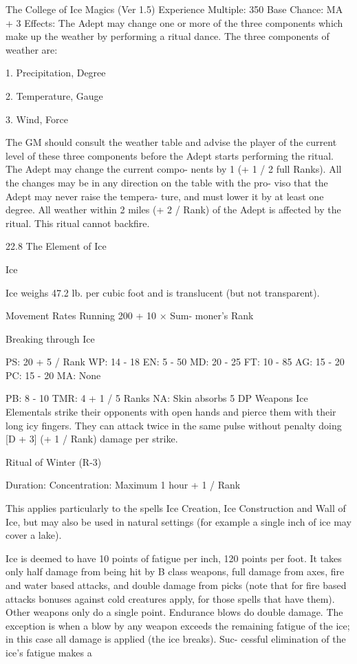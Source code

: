 \begin{Chapter}{The College of Ice Magics (Ver 1.5)}
Experience Multiple: 350 
Base Chance: MA + 3%
Effects: The Adept may change one or more of the 
three  components  which  make  up  the  weather  by 
performing a ritual dance. The three components of 
weather are: 

1. Precipitation, Degree 

2. Temperature, Gauge 

3. Wind, Force 

The  GM  should  consult  the  weather  table  and 
advise the player of the current level of these three 
components before the Adept starts performing the 
ritual.  The  Adept  may  change  the  current  compo-
nents  by  1  (+  1  /  2  full  Ranks).  All  the  changes 
may  be  in any  direction  on  the  table  with  the  pro-
viso  that  the  Adept  may  never  raise  the  tempera-
ture,  and must  lower  it  by  at  least  one  degree.  All 
weather within 2 miles (+ 2 / Rank) of the Adept is 
affected by the ritual. This ritual cannot backfire. 

22.8 The Element of Ice 

Ice 

Ice weighs 47.2 lb. per cubic foot and is translucent 
(but not transparent). 

Movement  Rates  Running  200  +  10  ×  Sum-
moner’s Rank 

Breaking through Ice 

PS: 20 + 5 / Rank  WP: 14 - 18 
EN: 5 - 50 
MD: 20 - 25 
FT: 10 - 85 
AG: 15 - 20 
PC: 15 - 20 
MA: None 
 
PB: 8 - 10 
TMR: 4 + 1 / 5 Ranks 
NA: Skin absorbs 5 DP 
Weapons  Ice  Elementals  strike  their  opponents 
with  open  hands  and  pierce  them  with  their  long 
icy fingers. They can attack twice in the same pulse 
without penalty doing [D + 3] (+ 1 / Rank) damage 
per strike. 

Ritual of Winter (R-3) 

Duration:  Concentration:  Maximum  1  hour  +  1  / 
Rank 

This applies particularly to the spells  Ice Creation, 
Ice Construction and Wall of  Ice, but may also be 
used  in  natural  settings  (for  example  a  single  inch 
of ice may cover a lake). 

Ice is deemed to have 10 points of fatigue per inch, 
120 points per foot. It takes only half damage from 
being  hit  by  B  class  weapons,  full  damage  from 
axes,  fire  and  water  based  attacks,  and  double 
damage from picks (note that for fire based attacks 
bonuses  against  cold  creatures  apply,  for  those 
spells  that  have  them).  Other  weapons  only  do  a 
single  point.  Endurance  blows  do  double  damage. 
The  exception  is  when  a  blow  by  any  weapon 
exceeds  the  remaining  fatigue  of  the  ice;  in  this 
case  all  damage  is  applied  (the  ice  breaks).  Suc-
cessful  elimination  of  the  ice’s  fatigue  makes  a 


\end{Chapter}
